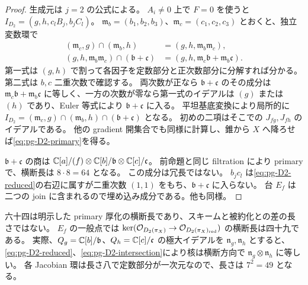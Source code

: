 \begin{proof}
生成元は $j=2$ の公式による。
$A_i\neq0$ 上で $F=0$ を使うと
$I_{D_2}=(g,h,c_lB_j,b_jC_l)$。
$\mathfrak m_b=(b_1,b_2,b_3)$、$\mathfrak m_c=(c_1,c_2,c_3)$ とおくと、独立変数環で
\begin{align}
(\mathfrak m_c,g)\cap(\mathfrak m_b,h)&=(g,h,\mathfrak m_b\mathfrak m_c),\label{eq:pg-D2-reduced}\\
(g,h,\mathfrak m_b\mathfrak m_c)\cap(\mathfrak b+\mathfrak c)
&=(g,h,\mathfrak m_c\mathfrak b+\mathfrak m_b\mathfrak c).\label{eq:pg-D2-intersection}
\end{align}
第一式は $(g,h)$ で割って各因子を定数部分と正次数部分に分解すれば分かる。
第二式は $b,c$ 二重次数で確認する。
両次数が正なら $\mathfrak b+\mathfrak c$ のその成分は
$\mathfrak m_c\mathfrak b+\mathfrak m_b\mathfrak c$ に等しく、一方の次数が零なら第一式のイデアルは $(g)$ または $(h)$ であり、Euler 等式により $\mathfrak b+\mathfrak c$ に入る。
平坦基底変換により局所的に
$I_{D_2}=(\mathfrak m_c,g)\cap(\mathfrak m_b,h)\cap(\mathfrak b+\mathfrak c)$ となる。
初めの二項はそこでの $J_{fg},J_{fh}$ のイデアルである。
他の gradient 開集合でも同様に計算し、錐から $X$ へ降ろせば\eqref{eq:pg-D2-primary}を得る。

$\mathfrak b+\mathfrak c$ の商は
$\mathbb C[a]/(f)\otimes\mathbb C[b]/\mathfrak b\otimes\mathbb C[c]/\mathfrak c$。
前命題と同じ filtration により primary で、横断長は $8\cdot8=64$ となる。
この成分は冗長ではない。
$b_jc_l$ は\eqref{eq:pg-D2-reduced}の右辺に属すが二重次数 $(1,1)$ をもち、$\mathfrak b+\mathfrak c$ に入らない。
台 $E_f$ は二つの join に含まれるので埋め込み成分である。他も同様。
\end{proof}
\begin{remark}\label{rem:pg-length49}
六十四は明示した primary 厚化の横断長であり、スキームと被約化との差の長さではない。
$E_f$ の一般点では
$\ker(\mathcal O_{D_2(\pi_X)}\to\mathcal O_{D_2(\pi_X)_{\mathrm{red}}})$ の横断長は四十九である。
実際、$Q_g=\mathbb C[b]/\mathfrak b$、$Q_h=\mathbb C[c]/\mathfrak c$ の極大イデアルを
$\mathfrak n_g,\mathfrak n_h$ とすると、\eqref{eq:pg-D2-reduced}、\eqref{eq:pg-D2-intersection}により核は横断方向で $\mathfrak n_g\otimes\mathfrak n_h$ に等しい。
各 Jacobian 環は長さ八で定数部分が一次元なので、長さは $7^2=49$ となる。
\end{remark}

